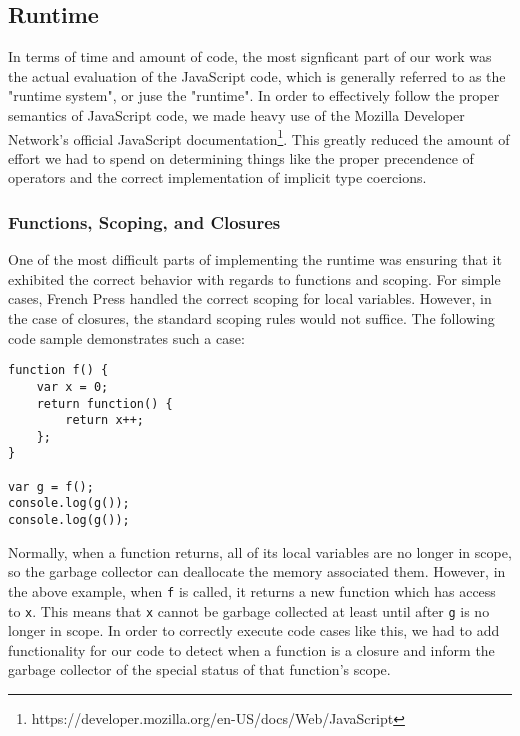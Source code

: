\documentclass{article}
\begin{document}
\subsection*{Runtime}

In terms of time and amount of code, the most signficant part of our work was
the actual evaluation of the JavaScript code, which is generally referred to as
the "runtime system", or juse the "runtime". In order to effectively follow the
proper semantics of JavaScript code, we made heavy use of the Mozilla Developer
Network's official JavaScript
documentation\footnote{https://developer.mozilla.org/en-US/docs/Web/JavaScript}.
This greatly reduced the amount of effort we had to spend on determining things
like the proper precendence of operators and the correct implementation of
implicit type coercions.

\subsubsection*{Functions, Scoping, and Closures}

One of the most difficult parts of implementing the runtime was ensuring that it
exhibited the correct behavior with regards to functions and scoping. For simple
cases, French Press handled the correct scoping for local variables. However,
in the case of closures, the standard scoping rules would not suffice. The
following code sample demonstrates such a case:

\vspace{3mm}

\begin{lstlisting}
function f() {
    var x = 0;
    return function() {
        return x++;
    };
}

var g = f();
console.log(g());
console.log(g());

\end{lstlisting}

\vspace{3mm}

Normally, when a function returns, all of its local variables are no longer in
scope, so the garbage collector can deallocate the memory associated them.
However, in the above example, when \texttt{f} is called, it returns a new
function which has access to \texttt{x}. This means that \texttt{x} cannot
be garbage collected at least until after \texttt{g} is no longer in scope.
In order to correctly execute code cases like this, we had to add functionality
for our code to detect when a function is a closure and inform the garbage
collector of the special status of that function's scope.
\end{document}
